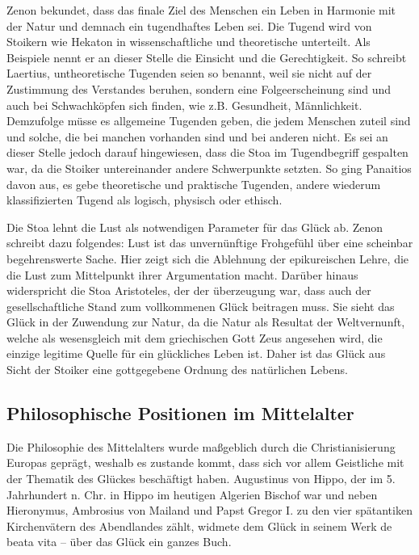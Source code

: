 Zenon bekundet, dass das finale Ziel des Menschen ein Leben in Harmonie mit der Natur und demnach ein tugendhaftes Leben sei. 
Die Tugend wird von Stoikern wie Hekaton in wissenschaftliche und theoretische unterteilt. 
Als Beispiele nennt er an dieser Stelle die Einsicht und die Gerechtigkeit. 
So schreibt Laertius, untheoretische Tugenden seien so benannt, \glqq weil sie  nicht auf der Zustimmung des Verstandes beruhen, sondern eine Folgeerscheinung sind und auch bei Schwachköpfen sich finden, wie z.B. Gesundheit, Männlichkeit.\grqq{}\cite{DL67, Siebentes Buch S.50}
Demzufolge müsse es allgemeine Tugenden geben, die jedem Menschen zuteil sind und solche, die bei manchen vorhanden sind und bei anderen nicht. 
Es sei an dieser Stelle jedoch darauf hingewiesen, dass die Stoa im Tugendbegriff gespalten war, da die Stoiker untereinander andere Schwerpunkte setzten. 
So ging Panaitios davon aus, es gebe theoretische und praktische Tugenden, andere wiederum klassifizierten Tugend als logisch, physisch oder ethisch.

Die Stoa lehnt die Lust als notwendigen Parameter für das Glück ab. 
Zenon schreibt dazu folgendes: \glqq Lust ist das unvernünftige Frohgefühl über eine scheinbar begehrenswerte Sache.\grqq{}\cite{DL67, Siebentes Buch S.60}
Hier zeigt sich die Ablehnung der epikureischen Lehre, die die Lust zum Mittelpunkt ihrer Argumentation macht. 
Darüber hinaus widerspricht die Stoa Aristoteles, der der überzeugung war, dass auch der gesellschaftliche Stand zum vollkommenen Glück beitragen muss. 
Sie sieht das Glück in der Zuwendung zur Natur, da die Natur als Resultat der Weltvernunft, welche als wesensgleich mit dem griechischen Gott Zeus angesehen wird, die einzige legitime Quelle für ein glückliches Leben ist\cite{DL67, Siebentes Buch S.49}.
Daher ist das Glück aus Sicht der Stoiker eine gottgegebene Ordnung des natürlichen Lebens. 


\newpage

\subsection{Philosophische Positionen im Mittelalter}

Die Philosophie des Mittelalters wurde maßgeblich durch die Christianisierung Europas geprägt, weshalb es zustande kommt, dass sich vor allem Geistliche mit der Thematik des Glückes beschäftigt haben. 
Augustinus von Hippo, der im 5. Jahrhundert n. Chr. in Hippo im heutigen Algerien Bischof war und neben Hieronymus, Ambrosius von Mailand und Papst Gregor I. zu den vier spätantiken Kirchenvätern des Abendlandes zählt, widmete dem Glück in seinem Werk \glqq de beata vita -- über das Glück\grqq{} ein ganzes Buch.

